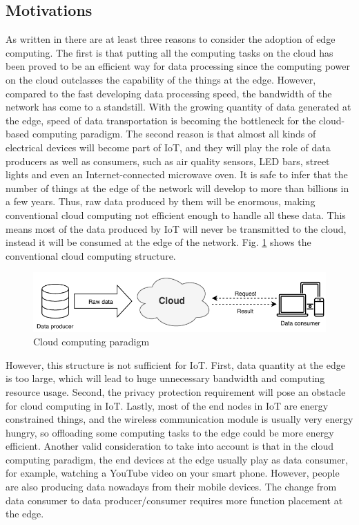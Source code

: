 \subsection{Motivations}
As written in \cite{edgecomputingvision} there are at least three reasons to consider the adoption of edge computing. The first is that putting all the computing tasks on the cloud has been proved to be an efficient way for data processing since the computing power on the cloud outclasses the capability of the things at the edge. However, compared to the fast developing data processing speed, the bandwidth of the network has come to a standstill. With the growing quantity of data generated at the edge, speed of data transportation is becoming the bottleneck for the cloud-based computing paradigm.
The second reason is that almost all kinds of electrical devices will become part of IoT, and they will play the role of data producers as well as consumers, such as air quality sensors, LED bars, street lights and even an Internet-connected microwave oven. It is safe to infer that the number of things at the edge of the network will develop to more than billions in a few
years. Thus, raw data produced by them will be enormous, making conventional cloud computing not efficient enough to handle all these data. This means most of the data produced by IoT will never be transmitted to the cloud, instead it will be consumed at the edge of the network. Fig. \ref{fig:cloudarch} shows the conventional cloud computing structure.

\begin{figure}[tbp]
	\centering
	\includegraphics[width=0.9\linewidth]{images/cloudarch}
	\caption{Cloud computing paradigm}
	\label{fig:cloudarch}
\end{figure}

However, this structure is not sufficient for IoT. First, data quantity at the edge is too large, which will lead to huge unnecessary bandwidth and computing resource usage. Second, the privacy protection requirement will pose an obstacle for cloud computing in IoT. Lastly, most of the end nodes in IoT are energy constrained things, and the wireless communication module is usually very energy hungry, so offloading some computing tasks to the edge could be more energy efficient.
Another valid consideration to take into account is that in the cloud computing paradigm, the end devices at the edge usually play as data consumer, for example, watching a YouTube video on
your smart phone. However, people are also producing data nowadays from their mobile devices. The change from data consumer to data producer/consumer requires more function placement at the edge.


